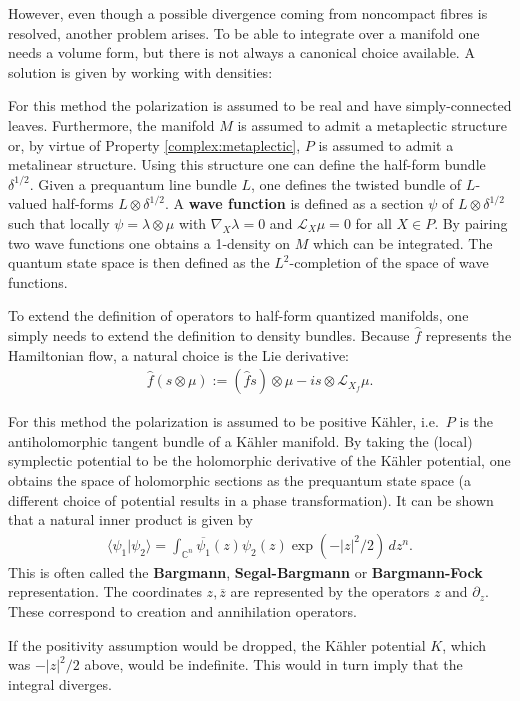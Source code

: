     However, even though a possible divergence coming from noncompact fibres is resolved, another problem arises. To be able to integrate over a manifold one needs a volume form, but there is not always a canonical choice available. A solution is given by working with densities:
    \begin{method}
        For this method the polarization is assumed to be real and have simply-connected leaves. Furthermore, the manifold $M$ is assumed to admit a metaplectic structure or, by virtue of Property \ref{complex:metaplectic}, $P$ is assumed to admit a metalinear structure. Using this structure one can define the half-form bundle $\delta^{1/2}$. Given a prequantum line bundle $L$, one defines the twisted bundle of $L$-valued half-forms $L\otimes\delta^{1/2}$. A \textbf{wave function} is defined as a section $\psi$ of $L\otimes\delta^{1/2}$ such that locally $\psi=\lambda\otimes\mu$ with $\nabla_X\lambda=0$ and $\mathcal{L}_X\mu=0$ for all $X\in P$. By pairing two wave functions one obtains a 1-density on $M$ which can be integrated. The quantum state space is then defined as the $L^2$-completion of the space of wave functions.

        To extend the definition of operators to half-form quantized manifolds, one simply needs to extend the definition to density bundles. Because $\hat{f}$ represents the Hamiltonian flow, a natural choice is the Lie derivative:
        \begin{gather}
            \hat{f}(s\otimes\mu) := (\hat{f}s)\otimes\mu - is\otimes\mathcal{L}_{X_f}\mu.
        \end{gather}
    \end{method}

    \begin{example}
        For this method the polarization is assumed to be positive K\"ahler, i.e.~$P$ is the antiholomorphic tangent bundle of a K\"ahler manifold. By taking the (local) symplectic potential to be the holomorphic derivative of the K\"ahler potential, one obtains the space of holomorphic sections as the prequantum state space (a different choice of potential results in a phase transformation). It can be shown that a natural inner product is given by
        \begin{gather}
            \langle\psi_1|\psi_2\rangle = \int_{\mathbb{C}^n}\overline{\psi_1}(z)\psi_2(z)\exp(-|z|^2/2)\,dz^n.
        \end{gather}
        This is often called the \textbf{Bargmann}, \textbf{Segal-Bargmann} or \textbf{Bargmann-Fock} representation. The coordinates $z,\overline{z}$ are represented by the operators $z$ and $\partial_z$. These correspond to creation and annihilation operators.
    \end{example}
    \begin{remark}
        If the positivity assumption would be dropped, the K\"ahler potential $K$, which was $-|z|^2/2$ above, would be indefinite. This would in turn imply that the integral diverges.
    \end{remark}

